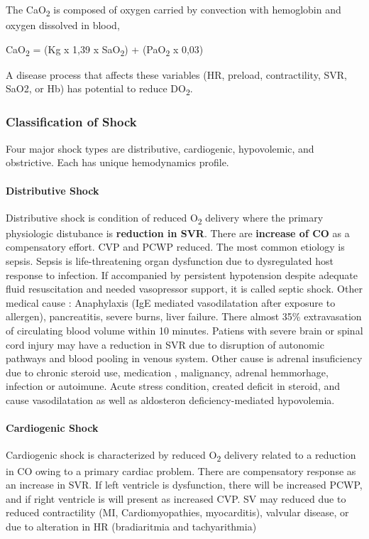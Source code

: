 \documentclass[
  letterpaper,
  DIV=11,
  numbers=noendperiod]{scrreprt}
\let\oldparagraph\paragraph
\renewcommand{\paragraph}[1]{\oldparagraph{#1}\mbox{}}
\begin{document}
The CaO\textsubscript{2} is composed of oxygen carried by convection
with hemoglobin and oxygen dissolved in blood,

CaO\textsubscript{2} = (Kg x 1,39 x SaO\textsubscript{2}) +
(PaO\textsubscript{2} x 0,03)

A disease process that affects these variables (HR, preload,
contractility, SVR, SaO2, or Hb) has potential to reduce
DO\textsubscript{2}.

\subsubsection{Classification of Shock}\label{classification-of-shock}

Four major shock types are distributive, cardiogenic, hypovolemic, and
obstrictive. Each has unique hemodynamics profile.

\paragraph{Distributive Shock}\label{distributive-shock}

Distributive shock is condition of reduced O\textsubscript{2} delivery
where the primary physiologic distubance is \textbf{reduction in SVR}.
There are \textbf{increase of CO} as a compensatory effort. CVP and PCWP
reduced. The most common etiology is sepsis. Sepsis is life-threatening
organ dysfunction due to dysregulated host response to infection. If
accompanied by persistent hypotension despite adequate fluid
resuscitation and needed vasopressor support, it is called septic shock.
Other medical cause : Anaphylaxis (IgE mediated vasodilatation after
exposure to allergen), pancreatitis, severe burns, liver failure. There
almost 35\% extravasation of circulating blood volume within 10 minutes.
Patiens with severe brain or spinal cord injury may have a reduction in
SVR due to disruption of autonomic pathways and blood pooling in venous
system. Other cause is adrenal insuficiency due to chronic steroid use,
medication , malignancy, adrenal hemmorhage, infection or autoimune.
Acute stress condition, created deficit in steroid, and cause
vasodilatation as well as aldosteron deficiency-mediated hypovolemia.

\paragraph{Cardiogenic Shock}\label{cardiogenic-shock}

Cardiogenic shock is characterized by reduced O\textsubscript{2}
delivery related to a reduction in CO owing to a primary cardiac
problem. There are compensatory response as an increase in SVR. If left
ventricle is dysfunction, there will be increased PCWP, and if right
ventricle is will present as increased CVP. SV may reduced due to
reduced contractility (MI, Cardiomyopathies, myocarditis), valvular
disease, or due to alteration in HR (bradiaritmia and tachyarithmia)
\end{document}
